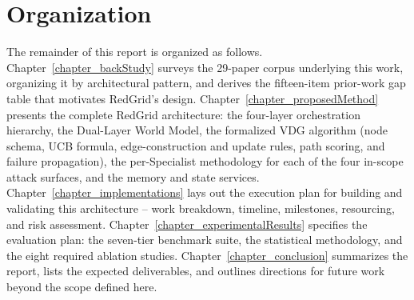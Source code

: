 \section{Organization}
\label{sec:intro_organization}

The remainder of this report is organized as follows. Chapter~\ref{chapter_backStudy} surveys the 29-paper corpus underlying this work, organizing it by architectural pattern, and derives the fifteen-item prior-work gap table that motivates RedGrid's design. Chapter~\ref{chapter_proposedMethod} presents the complete RedGrid architecture: the four-layer orchestration hierarchy, the Dual-Layer World Model, the formalized VDG algorithm (node schema, UCB formula, edge-construction and update rules, path scoring, and failure propagation), the per-Specialist methodology for each of the four in-scope attack surfaces, and the memory and state services. Chapter~\ref{chapter_implementations} lays out the execution plan for building and validating this architecture -- work breakdown, timeline, milestones, resourcing, and risk assessment. Chapter~\ref{chapter_experimentalResults} specifies the evaluation plan: the seven-tier benchmark suite, the statistical methodology, and the eight required ablation studies. Chapter~\ref{chapter_conclusion} summarizes the report, lists the expected deliverables, and outlines directions for future work beyond the scope defined here.

